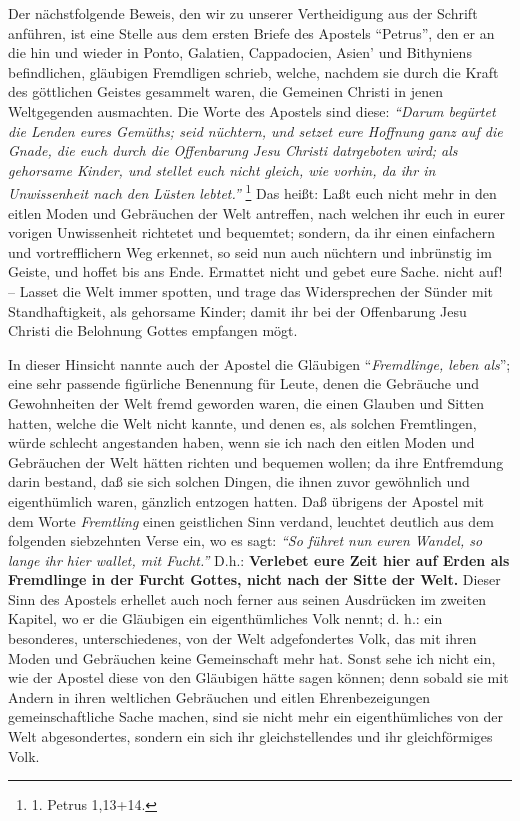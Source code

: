 Der nächstfolgende Beweis, den wir zu unserer Vertheidigung aus der Schrift
anführen, ist eine Stelle aus dem ersten Briefe des Apostels "`Petrus"', den er
an die hin und wieder in Ponto, Galatien, Cappadocien, Asien' und
Bithyniens befindlichen, gläubigen Fremdligen schrieb, welche, nachdem sie
durch die Kraft des göttlichen Geistes gesammelt waren, die Gemeinen Christi
in jenen Weltgegenden ausmachten. Die Worte des Apostels sind diese:
\textit{"`Darum
begürtet die Lenden eures Gemüths; seid nüchtern, und setzet eure Hoffnung ganz
auf die Gnade, die euch durch die Offenbarung Jesu Christi datrgeboten wird;
als gehorsame Kinder, und stellet euch nicht gleich, wie vorhin, da ihr in
Unwissenheit nach den Lüsten lebtet."'}
\footnote{1. Petrus 1,13+14.}
Das heißt:
Laßt euch nicht mehr in den eitlen Moden und Gebräuchen der Welt antreffen, nach
welchen ihr euch in eurer vorigen Unwissenheit richtetet und bequemtet; sondern,
da ihr einen einfachern und vortrefflichern Weg erkennet, so seid nun auch
nüchtern und inbrünstig im Geiste, und hoffet bis ans Ende. Ermattet nicht und
gebet eure Sache. nicht auf! -- Lasset die Welt immer spotten, und trage das
Widersprechen der Sünder mit Standhaftigkeit, als gehorsame Kinder; damit ihr
bei der Offenbarung Jesu Christi die Belohnung Gottes empfangen mögt.

\medskip


In dieser Hinsicht nannte auch der Apostel die Gläubigen "`\textit{Fremdlinge,
leben als}"';  eine sehr
passende figürliche Benennung für Leute, denen die Gebräuche und Gewohnheiten
der Welt fremd geworden waren, die einen Glauben und Sitten hatten, welche die
Welt nicht kannte, und denen es, als solchen Fremtlingen, würde schlecht
angestanden haben, wenn sie ich nach den eitlen Moden und Gebräuchen der Welt
hätten richten und bequemen wollen; da ihre Entfremdung darin bestand, daß sie
sich solchen Dingen, die ihnen zuvor gewöhnlich und eigenthümlich waren,
gänzlich entzogen hatten. Daß übrigens der Apostel mit dem Worte
\textit{Fremtling}
einen geistlichen Sinn verdand, leuchtet deutlich aus dem folgenden siebzehnten
Verse ein, wo es sagt:
\textit{"`So führet nun euren Wandel, so lange ihr hier wallet,
mit Fucht."'}
D.h.: \textbf{Verlebet eure Zeit hier auf Erden als Fremdlinge in der
Furcht Gottes, nicht nach der Sitte der Welt.} Dieser Sinn des Apostels erhellet
auch noch ferner aus seinen Ausdrücken im zweiten Kapitel, wo er die Gläubigen
ein eigenthümliches Volk nennt; d. h.: ein besonderes, unterschiedenes, von der
Welt adgefondertes Volk, das mit ihren Moden und Gebräuchen keine Gemeinschaft
mehr hat. Sonst sehe ich nicht ein, wie der Apostel diese von den Gläubigen
hätte sagen können; denn sobald sie mit Andern in ihren weltlichen Gebräuchen
und eitlen Ehrenbezeigungen gemeinschaftliche Sache machen, sind sie nicht mehr
ein eigenthümliches von der Welt abgesondertes, sondern ein sich ihr
gleichstellendes und ihr gleichförmiges Volk.

